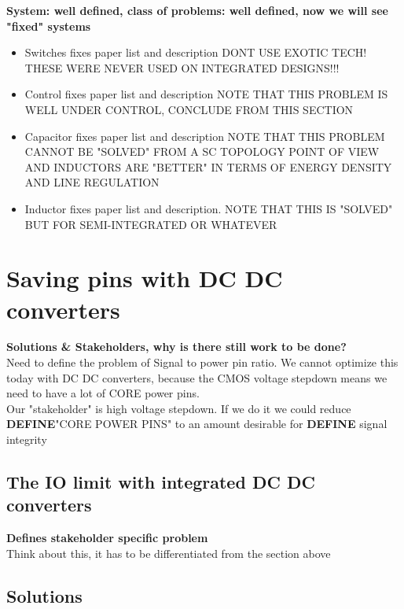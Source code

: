 \documentclass[letterpaper,twocolumn,10pt]{article}
\begin{document}
\textbf{System: well defined, class of problems: well defined, now we will see "fixed" systems}\\
\begin{itemize}
\item{Switches fixes paper list and description DONT USE EXOTIC TECH! THESE WERE NEVER USED ON INTEGRATED DESIGNS!!!}
\item{Control fixes paper list and description NOTE THAT THIS PROBLEM IS WELL UNDER CONTROL, CONCLUDE FROM THIS SECTION}
\item{Capacitor fixes paper list and description NOTE THAT THIS PROBLEM CANNOT BE "SOLVED" FROM A SC TOPOLOGY POINT OF VIEW AND INDUCTORS ARE "BETTER" IN TERMS OF ENERGY DENSITY AND LINE REGULATION}
\item{Inductor fixes paper list and description. NOTE THAT THIS IS "SOLVED" BUT FOR SEMI-INTEGRATED OR WHATEVER}
\end{itemize}

\section{Saving pins with DC DC converters}

\textbf{Solutions \& Stakeholders, why is there still work to be done?}\\
Need to define the problem of Signal to power pin ratio. We cannot optimize this today with DC DC converters, because the \@ CMOS voltage stepdown means we need to have a lot of CORE power pins.\\
Our "stakeholder" is high voltage stepdown. If we do it we could reduce \textbf{DEFINE}"CORE POWER PINS" to an amount desirable for \textbf{DEFINE} signal integrity\\

\subsection{The IO limit with integrated DC DC converters}

\textbf{Defines stakeholder specific problem}\\
Think about this, it has to be differentiated from the section above

\subsection{Solutions}
\end{document}

